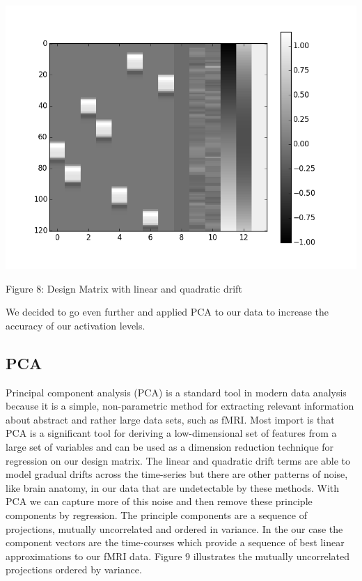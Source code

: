 \documentclass[12pt]{article}
\begin{document}
\begin{housevseverything}
    \centering
      \includegraphics[width=1\textwidth]{desing_matrix_dt_pca}
    \caption{Figure 8: Design Matrix with linear and quadratic drift}
\end{housevseverything}

We decided to go even further and applied PCA to our data to increase the accuracy of our activation levels. 

\subsection{PCA}
Principal component analysis (PCA) is a standard tool in modern data analysis 
because it is a simple, non-parametric method for extracting relevant 
information about abstract and rather large data sets, such as fMRI.  Most 
import is that PCA is a significant tool for deriving a low-dimensional set of 
features from a large set of variables and can be used as a dimension reduction 
technique for regression on our design matrix. The linear and quadratic drift 
terms are able to model gradual drifts across the time-series but there are 
other patterns of noise, like brain anatomy, in our data that are undetectable 
by these methods. With PCA we can capture more of this noise and then remove 
these principle components by regression. The principle components are a 
sequence of projections, mutually uncorrelated and ordered in variance. In the 
our case the component vectors are the time-courses which provide a sequence of 
best linear approximations to our fMRI data.  Figure 9 illustrates the mutually 
uncorrelated projections ordered by variance.
\end{document}
